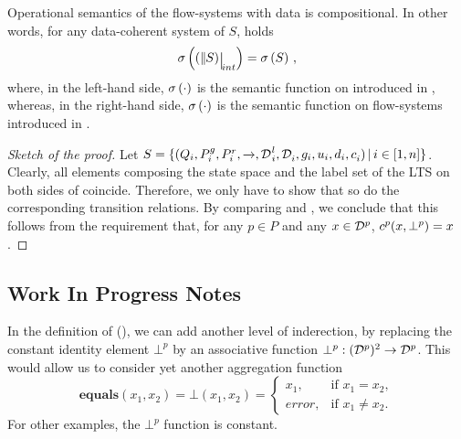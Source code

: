
\begin{theorem}
  \label{thm:compositionality}
  Operational semantics of the flow-systems with data is compositional. In
  other words, for any  data-coherent system of \datamodel{} $S$,
  holds
  \begin{equation}
    \label{eq:compositionality}
    \undata{\hide[int]{\compose[S]}} = \undata{S}\,,
  \end{equation}
  where, in the left-hand side, $\undata{\cdot}$ is the semantic function
  on \datamodel{} introduced in , whereas, in the
  right-hand side, $\undata{\cdot}$ is the semantic function on
  flow-systems introduced in .
\end{theorem}
%
\begin{proof}[Sketch of the proof]
  Let $S = \setdef{(Q_i, \pin_i, \pout_i, \goesto{}, \local{\data}_i,
    \data_i, \guard_i, \up_i, \down_i, \combine_i)}{i \in [1,n]}$.
  Clearly, all elements composing the state space and the label set of the
  LTS on both sides of  coincide.  Therefore, we only
  have to show that so do the corresponding transition relations.  By
  comparing  and , we conclude that this
  follows from the requirement that, for any $p \in P$ and any $x \in
  \data[p]$, $\combine[p](x, \bot^p) = x$.
\end{proof}


\subsection*{Work In Progress Notes}

In the definition of \datamodel{} (), we can add another level
of inderection, by replacing the constant identity element $\bot^p$ by an
associative function $\bot^p: (\data[p])^2 \rightarrow \data[p]$.  This
would allow us to consider yet another aggregation function
\[
  \mathbf{equals}(x_1,x_2) = \bot(x_1,x_2) = 
  \begin{cases}
    x_1, & \mbox{if } x_1 = x_2,\\
    error, & \mbox{if } x_1 \neq x_2.
  \end{cases}
\]
For other examples, the $\bot^p$ function is constant.  

